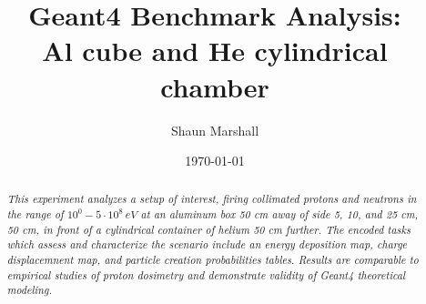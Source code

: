 \documentclass[11pt]{article}
\title{Geant4 Benchmark Analysis:\\ Al cube and He cylindrical chamber}
\author{Shaun Marshall}
\date{\today}
\begin{document}
\maketitle

\begin{abstract}\emph{
This experiment analyzes a setup of interest, firing collimated protons and neutrons in the range of $10^0-5\cdot10^8\ eV$ at an aluminum box 50 cm away of side 5, 10, and 25 cm, 50 cm, in front of a cylindrical container of helium 50 cm further.  The encoded tasks which assess and characterize the scenario include an energy deposition map, charge displacemnent map, and particle creation probabilities tables.  Results are comparable to empirical studies of proton dosimetry and demonstrate validity of Geant4 theoretical modeling.
}\end{abstract}
\end{document}
